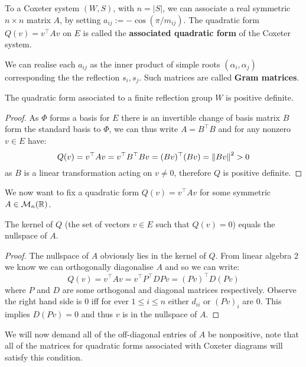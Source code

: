 \documentclass[../main.tex]{subfiles}
\begin{document}
\begin{definition}
    To a Coxeter system $(W,S)$, with $n=|S|$, we can associate a real symmetric $n\times n$ matrix $A$, by setting $a_{ij}:= -\cos(\pi/m_{ij})$. The quadratic form $Q(v) = v^\top A v$ on $E$ is called the \textbf{associated quadratic form} of the Coxeter system.
\end{definition}

We can realise each $a_{ij}$ as the inner product of simple roots $(\alpha_i,\alpha_j)$ corresponding the the reflection $s_i,s_j$. Such matrices are called \textbf{Gram matrices}.

\begin{proposition}
    The quadratic form associated to a finite reflection group $W$ is positive definite.
    \begin{proof}
        As $\Phi$ forms a basis for $E$ there is an invertible change of basis matrix $B$ form the standard basis to $\Phi$, we can thus write $A=B^\top B$ and for any nonzero $v\in E$ have:\[
        Q(v) = v^\top A v = v^\top B^\top B v = (B v)^\top (B v) = \left\lVert B v \right\rVert^2 > 0
        \] as $B$ is a linear transformation acting on $v\neq 0$, therefore $Q$ is positive definite.
    \end{proof}
\end{proposition}

We now want to fix a quadratic form $Q(v) = v^\top A v$ for some symmetric $A\in\mathcal{M}_n(\mathbb{R})$.

\begin{lemma}
    The kernel of $Q$ (the set of vectors $v\in E$ such that $Q(v)=0$) equals the nullspace of $A$.
    \begin{proof}
        The nullspace of $A$ obviously lies in the kernel of $Q$. From linear algebra 2 we know we can orthogonally diagonalise $A$ and so we can write: \[
            Q(v) = v^\top A v = v^\top P^\top D P v = (P v)^\top D (P v)
        \] where $P$ and $D$ are some orthogonal and diagonal matrices respectively. Observe the right hand side is $0$ iff for ever $1\leq i \leq n$ either $d_{ii}$ or $(P v)_i$ are $0$. This implies $D (P v)=0$ and thus $v$ is in the nullspace of $A$.
    \end{proof}
\end{lemma}

We will now demand all of the off-diagonal entries of $A$ be nonpositive, note that all of the matrices for quadratic forms associated with Coxeter diagrams will satisfy this condition.
\end{document}
